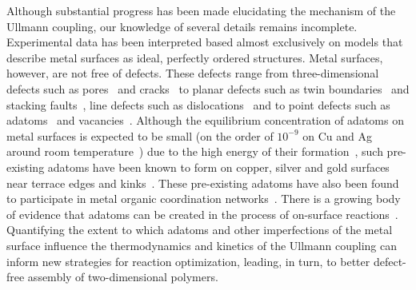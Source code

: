 \documentclass[aps,prb,amsmath,amssymb,11pt]{revtex4-1}
\newcommand{\zhzh}{\color{black}}
\renewcommand{\sout}[1]{\unskip}
\begin{document}
Although substantial progress has been made elucidating the mechanism of the Ullmann coupling, our knowledge of several details remains incomplete. Experimental data has been interpreted based almost exclusively on models that describe metal surfaces as ideal, perfectly ordered structures. 
%
Metal surfaces, however, are not free of defects. These defects range from three-dimensional defects such as pores~\cite{ullmann_72} and cracks~\cite{ullmann_73} to planar defects such as twin boundaries~\cite{ullmann_74} and stacking faults~\cite{ullmann_75}, line defects such as dislocations~\cite{Ullmann_76} and to point defects such as adatoms~\cite{Ullmann_77} and vacancies~\cite{ullmann_78}.
%
\sout{It is well known that adatoms are created on clean copper, silver and gold surfaces~\cite{ullmann_79, ullmann_58}, especially near terrace edges and kinks~\cite{ullmann_84, ullmann_85}, in the process of the thermal motion of metal atoms. 
Although the equilibrium concentration of adatoms on clean surfaces is expected to be extremely small due to the high energy of their formation~\cite{chemeurope2017}, such pre-existing adatoms have been known to participate in metal organic coordination networks~\cite{ullmann_80, ullmann_81, ullmann_82, ullmann_83}.}
{\zhzh Although the equilibrium concentration of adatoms on metal surfaces is expected to be small (on the order of $10^{-9}$ on Cu and Ag around room temperature~\cite{ullmann_175}) due to the high energy of their formation~\cite{chemeurope2017}, such pre-existing adatoms have been known to form on copper, silver and gold surfaces~\cite{ullmann_79, ullmann_58} near terrace edges and kinks~\cite{ullmann_84, ullmann_85}. These pre-existing adatoms have also been found to participate in metal organic coordination networks~\cite{ullmann_80, ullmann_81, ullmann_82, ullmann_83, ullmann_170, ullmann_147}.}
There is \sout{also} a growing body of evidence that adatoms can be created in the process of on-surface reactions~\cite{ullmann_146, ullmann_53, chematerial2019, ullmann_147, chemeurope2017, ullmann_98, ullmann_91}. %
Quantifying the extent to which adatoms and other imperfections of the metal surface influence the thermodynamics and kinetics of the Ullmann coupling can inform new strategies for reaction optimization, leading, in turn, to better defect-free assembly of two-dimensional polymers. 
\end{document}

